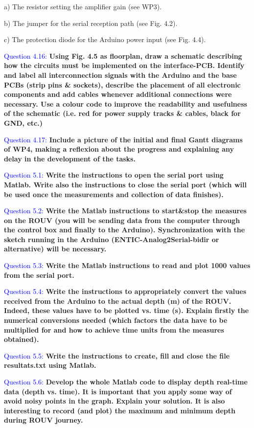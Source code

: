 \documentclass[12pt, a4papre]{article}
\begin{document}
	a)  The resistor setting the amplifier gain (see WP3).
	
	b)  The jumper for the serial reception path (see Fig. 4.2).
	
	c)  The protection diode for the Arduino power input (see Fig. 4.4).

	\textcolor{blue}{Question 4.16:} \textbf{Using Fig. 4.5 as floorplan, draw a schematic describing how the circuits must be implemented on the interface-PCB. Identify and label all interconnection signals with the Arduino and the base PCBs (strip pins \& sockets), describe the placement of all electronic components and add cables whenever additional connections were necessary. Use a colour code to improve the readability and usefulness of the schematic (i.e. red for power supply tracks \& cables, black for GND, etc.)}

	\textcolor{blue}{Question 4.17:} \textbf{Include a picture of the initial and final Gantt diagrams of WP4, making a reflexion about the progress and explaining any delay in the development of the tasks.}
	
	\textcolor{blue}{Question 5.1:} \textbf{Write the instructions to open the serial port using Matlab. Write also the instructions to close the serial port (which will be used once the measurements and collection of data finishes).}
	
	\textcolor{blue}{Question 5.2:} \textbf{Write the Matlab instructions to start&stop the measures on the ROUV (you will be sending data from the computer through the control box and finally to the Arduino). Synchronization with the sketch running in the Arduino (ENTIC-Analog2Serial-bidir or alternative) will be necessary.}
	
	\textcolor{blue}{Question 5.3:} \textbf{Write the Matlab instructions to read and plot 1000 values from the serial port. }
	
	\textcolor{blue}{Question 5.4:} \textbf{Write the instructions to appropriately convert the values received from the Arduino to the actual depth (m) of the ROUV. Indeed, these values have to be plotted vs. time (s). Explain firstly the numerical conversions needed (which factors the data have to be multiplied for and how to achieve time units from the measures obtained).}
	
	\textcolor{blue}{Question 5.5:} \textbf{Write the instructions to create, fill and close the file resultats.txt using Matlab.}
	
	\textcolor{blue}{Question 5.6:} \textbf{Develop the whole Matlab code to display depth real-time data (depth vs. time). It is important that you apply some way of avoid noisy points in the graph. Explain your solution. It is also interesting to record (and plot) the maximum and minimum depth during ROUV journey.}
	
\end{document}

